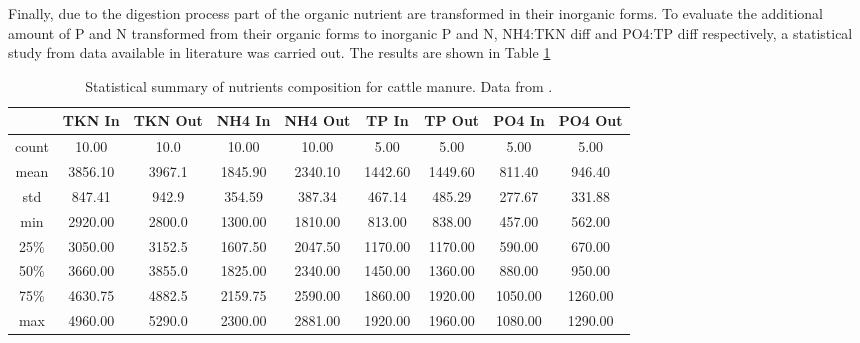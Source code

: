\documentclass[10pt,a4paper]{article}
\begin{document}
Finally, due to the digestion process part of the organic nutrient are transformed in their inorganic forms. To evaluate the additional amount of P and N transformed from their organic forms to inorganic P and N, NH4:TKN diff and PO4:TP diff respectively, a statistical study from data available in literature was carried out. The results are shown in Table \ref{table:nut_mod}
\begin{table}[H] 
	\centering
	\caption{Statistical summary of nutrients composition for cattle manure. Data from \cite{ADAS,Martin2,delaFuente,Sorensen}.} \label{table:nut_mod}
\begin{tabular}{ccccccccc}
	\toprule
	{} 	  &  TKN In		 &  TKN Out 	&  NH4 In 			&  NH4 Out 				&  TP In &			  TP Out &  			PO4 In &  				PO4 Out    \\
	\midrule
	count &    10.00 &        10.0 &     10.00 &                10.00 &                5.00 &                5.00 &                 5.00 &                 5.00    \\      
	mean  &   3856.10 &      3967.1 &  1845.90 &              2340.10 &             1442.60 &             1449.60 &               811.40 &               946.40    \\      
	std   &   847.41 &       942.9 &    354.59 &               387.34 &              467.14 &              485.29 &               277.67 &               331.88    \\      
	min   &   2920.00 &     2800.0 &    1300.00 &              1810.00 &              813.00 &              838.00 &               457.00 &               562.00   \\    
	25\%   &  3050.00 &     3152.5 &    1607.50 &              2047.50 &             1170.00 &             1170.00 &               590.00 &               670.00   \\  
	50\%   & 3660.00 &     3855.0 &     1825.00 &              2340.00 &             1450.00 &             1360.00 &               880.00 &               950.00   \\
	75\%   & 4630.75 &      4882.5 &    2159.75 &              2590.00 &             1860.00 &             1920.00 &              1050.00 &              1260.00   \\
	max   &     4960.00 &   5290.0 &     2300.00 &              2881.00 &             1920.00 &             1960.00 &              1080.00 &              1290.00  \\
	\bottomrule
\end{tabular}
\end{table}
\end{document}
